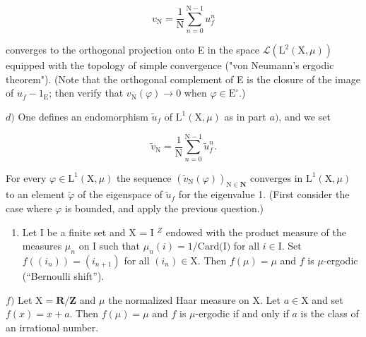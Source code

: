 \[
v _ {\mathrm{N}} = \frac {1}{\mathrm{N}} \sum_ {n = 0} ^ {\mathrm{N-1}} u _ {f} ^ {n}
\]

converges to the orthogonal projection onto E in the space \(\mathcal{L}(\mathrm{L}^{2}(\mathrm{X},\mu))\) equipped with the topology of simple convergence ("von Neumann's ergodic theorem"). (Note that the orthogonal complement of E is the closure of the image of \(u_{f}-1_{\mathrm{E}}\); then verify that \(v_{\mathrm{N}}(\varphi)\to0\) when \(\varphi\in\mathrm{E}^{\circ}\).)

\(d)\) One defines an endomorphism \(\widetilde{u}_f\) of \(\mathrm{L}^1 (\mathrm{X},\mu)\) as in part \(a)\), and we set

\[
\widetilde {v} _ {\mathrm{N}} = \frac {1}{\mathrm{N}} \sum_ {n = 0} ^ {\mathrm{N-1}} \widetilde {u} _ {f} ^ {n}.
\]

For every \(\varphi\in\mathrm{L}^{1}(\mathrm{X},\mu)\) the sequence \((\widetilde{v}_{\mathrm{N}}(\varphi))_{\mathrm{N}\in\mathbf{N}}\) converges in \(\mathrm{L}^{1}(\mathrm{X},\mu)\) to an element \(\widetilde{\varphi}\) of the eigenspace of \(\widetilde{u}_{f}\) for the eigenvalue 1. (First consider the case where \(\varphi\) is bounded, and apply the previous question.)

\begin{enumerate}
\def\labelenumi{\alph{enumi})}
\setcounter{enumi}{4}
\tightlist
\item
  Let I be a finite set and X = I \(^{Z}\) endowed with the product measure of the measures \(\mu_n\) on I such that \(\mu_n(i) = 1/\text{Card(I)}\) for all \(i \in \text{I}\). Set \(f((i_n)) = (i_{n+1})\) for all \((i_n) \in \text{X}\). Then \(f(\mu) = \mu\) and \(f\) is \(\mu\)-ergodic (“Bernoulli shift”).
\end{enumerate}

\(f)\) Let \(\mathrm{X} = \mathbf{R} / \mathbf{Z}\) and \(\mu\) the normalized Haar measure on \(\mathrm{X}\). Let \(a \in \mathrm{X}\) and set \(f(x) = x + a\). Then \(f(\mu) = \mu\) and \(f\) is \(\mu\)-ergodic if and only if \(a\) is the class of an irrational number.

